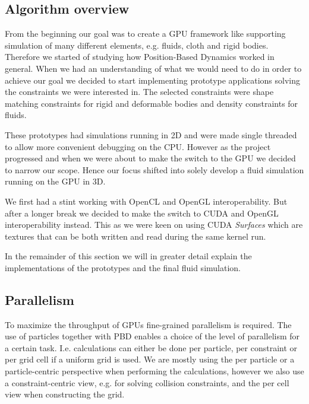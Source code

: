\subsection{Algorithm overview}


From the beginning our goal was to create a GPU framework like
\cite{macklin2014unified} supporting simulation of many different elements,
e.g. fluids, cloth and rigid bodies. Therefore we started of studying how
Position-Based Dynamics worked in general. When we had an understanding of what
we would need to do in order to achieve our goal we decided to start
implementing prototype applications solving the constraints we were interested
in. The selected constraints were shape matching constraints for rigid and
deformable bodies and density constraints for fluids.

These prototypes had simulations running in 2D and were made single threaded to
allow more convenient debugging on the CPU. However as the project progressed
and when we were about to make the switch to the GPU we decided to narrow our
scope. Hence our focus shifted into solely develop a fluid simulation running
on the GPU in 3D.

We first had a stint working with OpenCL and OpenGL interoperability. But after
a longer break we decided to make the switch to CUDA and OpenGL
interoperability instead. This as we were keen on using CUDA \textit{Surfaces}
which are textures that can be both written and read during the same kernel
run.

In the remainder of this section we will in greater detail explain the
implementations of the prototypes and the final fluid simulation.

\subsection{Parallelism} To maximize the throughput of GPUs fine-grained
parallelism is required. The use of particles together with PBD enables a
choice of the level of parallelism for a certain task. I.e. calculations can
either be done per particle, per constraint or per grid cell if a uniform grid
is used. We are mostly using the per particle or a particle-centric perspective
when performing the calculations, however we also use a constraint-centric
view, e.g. for solving collision constraints, and the per cell view when
constructing the grid.

